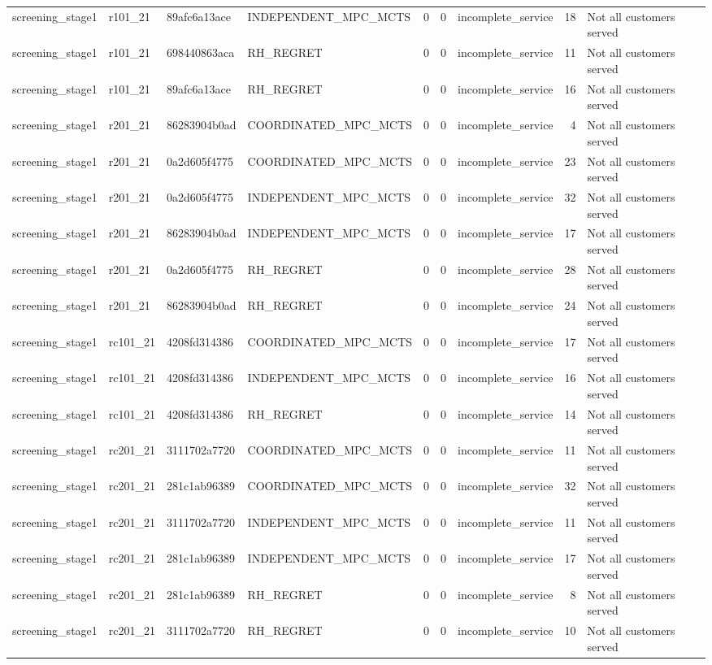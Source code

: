 \begin{table}
{\begin{tabular}{llllrrlrl}
screening\_stage1 & r101\_21 & 89afc6a13ace & INDEPENDENT\_MPC\_MCTS & 0 & 0 & incomplete\_service & 18 & Not all customers served \\
screening\_stage1 & r101\_21 & 698440863aca & RH\_REGRET & 0 & 0 & incomplete\_service & 11 & Not all customers served \\
screening\_stage1 & r101\_21 & 89afc6a13ace & RH\_REGRET & 0 & 0 & incomplete\_service & 16 & Not all customers served \\
screening\_stage1 & r201\_21 & 86283904b0ad & COORDINATED\_MPC\_MCTS & 0 & 0 & incomplete\_service & 4 & Not all customers served \\
screening\_stage1 & r201\_21 & 0a2d605f4775 & COORDINATED\_MPC\_MCTS & 0 & 0 & incomplete\_service & 23 & Not all customers served \\
screening\_stage1 & r201\_21 & 0a2d605f4775 & INDEPENDENT\_MPC\_MCTS & 0 & 0 & incomplete\_service & 32 & Not all customers served \\
screening\_stage1 & r201\_21 & 86283904b0ad & INDEPENDENT\_MPC\_MCTS & 0 & 0 & incomplete\_service & 17 & Not all customers served \\
screening\_stage1 & r201\_21 & 0a2d605f4775 & RH\_REGRET & 0 & 0 & incomplete\_service & 28 & Not all customers served \\
screening\_stage1 & r201\_21 & 86283904b0ad & RH\_REGRET & 0 & 0 & incomplete\_service & 24 & Not all customers served \\
screening\_stage1 & rc101\_21 & 4208fd314386 & COORDINATED\_MPC\_MCTS & 0 & 0 & incomplete\_service & 17 & Not all customers served \\
screening\_stage1 & rc101\_21 & 4208fd314386 & INDEPENDENT\_MPC\_MCTS & 0 & 0 & incomplete\_service & 16 & Not all customers served \\
screening\_stage1 & rc101\_21 & 4208fd314386 & RH\_REGRET & 0 & 0 & incomplete\_service & 14 & Not all customers served \\
screening\_stage1 & rc201\_21 & 3111702a7720 & COORDINATED\_MPC\_MCTS & 0 & 0 & incomplete\_service & 11 & Not all customers served \\
screening\_stage1 & rc201\_21 & 281c1ab96389 & COORDINATED\_MPC\_MCTS & 0 & 0 & incomplete\_service & 32 & Not all customers served \\
screening\_stage1 & rc201\_21 & 3111702a7720 & INDEPENDENT\_MPC\_MCTS & 0 & 0 & incomplete\_service & 11 & Not all customers served \\
screening\_stage1 & rc201\_21 & 281c1ab96389 & INDEPENDENT\_MPC\_MCTS & 0 & 0 & incomplete\_service & 17 & Not all customers served \\
screening\_stage1 & rc201\_21 & 281c1ab96389 & RH\_REGRET & 0 & 0 & incomplete\_service & 8 & Not all customers served \\
screening\_stage1 & rc201\_21 & 3111702a7720 & RH\_REGRET & 0 & 0 & incomplete\_service & 10 & Not all customers served \\
\bottomrule
\end{tabular}
}
\end{table}
